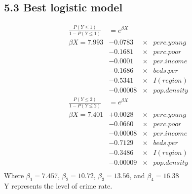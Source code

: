 \documentclass[oneside,11pt]{homework}
\begin{document}
\subsection*{5.3 Best logistic model}
\begin{equation}
\begin{aligned}
\frac{P(Y\leq 1)}{1-P(Y\leq 1)} &= e^{\beta X}&&\\
\beta X =  7.993  &- 0.0783           &\times &perc.young \\
                  &- 0.1681           &\times &perc.poor\\
                  &- 0.0001 &\times &per.income\\
                  &- 0.1686           &\times &beds.per \\
                  &- 0.5341           &\times &I(region) \\
                  &- 0.00008 &\times &pop.density\\
\frac{P(Y\leq 2)}{1-P(Y\leq 2)} &= e^{\beta X}&&\\
\beta X =  7.401  &+ 0.0028           &\times &perc.young \\
                  &- 0.0660           &\times &perc.poor\\
                  &- 0.00008 &\times &per.income\\
                  &- 0.7129           &\times &beds.per \\
                  &- 0.3486           &\times &I(region) \\
                  &- 0.00009 &\times &pop.density\\
\end{aligned}
\end{equation}
Where $\beta_1=7.457$, $ \beta_2=10.72$, $ \beta_3 = 13.56$, and $ \beta_4=16.38$\\
Y represents the level of crime rate.
\end{document}
